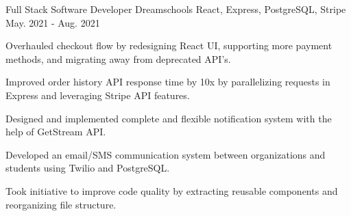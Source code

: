 \begin{cventries}
  \cventry
    {Full Stack Software Developer} %
    {Dreamschools} %
    {React, Express, PostgreSQL, Stripe} %
    {May. 2021 - Aug. 2021} %
    {
      \begin{cvitems} %
        \item {Overhauled checkout flow by redesigning React UI, supporting more payment methods, and migrating away from deprecated API's.}
        \item {Improved order history API response time by 10x by parallelizing requests in Express and leveraging Stripe API features.}
        \item {Designed and implemented complete and flexible notification system with the help of GetStream API.}
        \item {Developed an email/SMS communication system between organizations and students using Twilio and PostgreSQL.}
        \item {Took initiative to improve code quality by extracting reusable components and reorganizing file structure.}
      \end{cvitems}
    }
\end{cventries}
